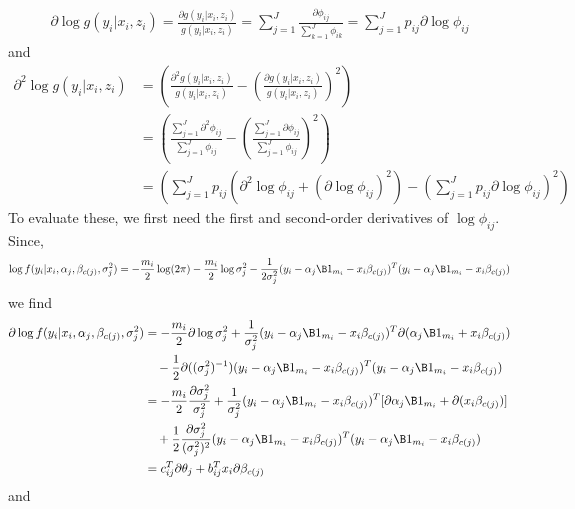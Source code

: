 \begin{align}\label{dg}
\partial \log g(y_{i}|x_{i},z_{i})=\frac{\partial g(y_{i}|x_{i},z_{i})}{g(y_{i}|x_{i},z_{i})}=\sum^{J}_{j=1}\frac{\partial \phi_{ij} }{\sum_{k=1}^{J} \phi_{ik}}=\sum^{J}_{j=1}p_{ij}\partial \log \phi_{ij}
\end{align}
and
\begin{align}\label{d2g}
\partial^{2} \log g(y_{i}|x_{i},z_{i})&=\left(\frac{\partial^{2} g(y_{i}|x_{i},z_{i})}{g(y_{i}|x_{i},z_{i})}-\left(\frac{\partial g(y_{i}|x_{i},z_{i})}{g(y_{i}|x_{i},z_{i})}\right)^{2}\right)\nonumber\\
&=\left(\frac{\sum^{J}_{j=1}\partial^{2}\phi_{ij}}{\sum^{J}_{j=1}\phi_{ij}}-\left(\frac{\sum^{J}_{j=1}\partial\phi_{ij}}{\sum^{J}_{j=1}\phi_{ij}}\right)^{2}\right)\nonumber\\
&=\left( \sum^{J}_{j=1}p_{ij}(\partial^{2}\log \phi_{ij} + (\partial \log \phi_{ij})^{2})-(\sum^{J}_{j=1}p_{ij}\partial \log \phi_{ij})^{2}\right)
\end{align}
To evaluate these, we first need the first and second-order derivatives of $\log\phi_{ij}$. Since,
$$\log f(y_{i}|x_{i},\alpha_{j},\beta_{c(j)},\sigma^{2}_{j})=-\frac{m_{i}}{2}\log(2\pi)-\frac{m_{i}}{2}\log\sigma_{j}^{2}-\frac{1}{2\sigma_{j}^{2}}(y_{i}-\alpha_{j}\B 1_{m_i}-x_{i}\beta_{c(j)})^{T}(y_{i}-\alpha_{j}\B 1_{m_i}-x_{i}\beta_{c(j)})$$
we find 
\begin{align*}
\partial \log f(y_{i}|x_{i},\alpha_{j},\beta_{c(j)},\sigma^{2}_{j}) &= -\frac{m_{i}}{2}\partial \log\sigma_{j}^{2}+\frac{1}{\sigma_{j}^{2}}(y_{i}-\alpha_{j}\B 1_{m_i}-x_{i}\beta_{c(j)})^{T}\partial (\alpha_{j}\B 1_{m_i}+x_{i}\beta_{c(j)})\\
&\quad- \frac{1}{2}\partial((\sigma_{j}^{2})^{-1})(y_{i}-\alpha_{j}\B 1_{m_i}-x_{i}\beta_{c(j)})^{T}(y_{i}-\alpha_{j}\B 1_{m_i}-x_{i}\beta_{c(j)})\\
&= -\frac{m_{i}}{2}\frac{\partial\sigma_{j}^{2}}{\sigma_{j}^{2}}+\frac{1}{\sigma_{j}^{2}}(y_{i}-\alpha_{j}\B 1_{m_i}-x_{i}\beta_{c(j)})^{T}[\partial \alpha_{j}\B 1_{m_i}+\partial(x_{i}\beta_{c(j)})]\\
&\quad+\frac{1}{2}\frac{\partial\sigma_{j}^{2}}{(\sigma_{j}^{2})^{2}}(y_{i}-\alpha_{j}\B 1_{m_i}-x_{i}\beta_{c(j)})^{T}(y_{i}-\alpha_{j}\B 1_{m_i}-x_{i}\beta_{c(j)})\\
&=c_{ij}^{T}\partial\theta_{j}+b_{ij}^{T}x_{i}\partial \beta_{c(j)}
\end{align*}
and
